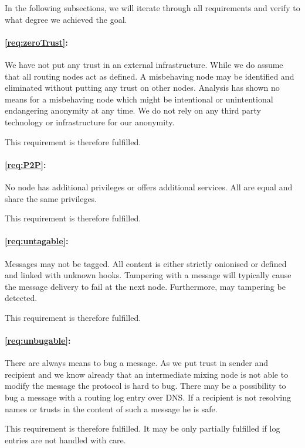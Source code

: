 In the following subsections, we will iterate through all requirements and verify to what degree we achieved the goal.

\paragraph*{\ref{req:zeroTrust}:} 
We have not put any trust in an external infrastructure. While we do assume that all routing nodes act as defined. A misbehaving node may be identified and eliminated without putting any trust on other nodes. Analysis has shown no means for a misbehaving node which might be intentional or unintentional endangering anonymity at any time. We do not rely on any third party technology or infrastructure for our anonymity. 

This requirement is therefore fulfilled.

\paragraph*{\ref{req:P2P}:} 
No node has additional privileges or offers additional services. All are equal and share the same privileges.

This requirement is therefore fulfilled.

\paragraph*{\ref{req:untagable}:} 
Messages may not be tagged. All content is either strictly onionised or defined and linked with unknown hooks. Tampering with a message will typically cause the message delivery to fail at the next node. Furthermore, may tampering be detected.

This requirement is therefore fulfilled.

\paragraph*{\ref{req:unbugable}:} 
There are always means to bug a message. As we put trust in sender and recipient and we know already that an intermediate mixing node is not able to modify the message the protocol is hard to bug. There may be a possibility to bug a message with a routing log entry over DNS. If a recipient is not resolving names or trusts in the content of such a message he is safe.

This requirement is therefore fulfilled. It may be only partially fulfilled if log entries are not handled with care.

